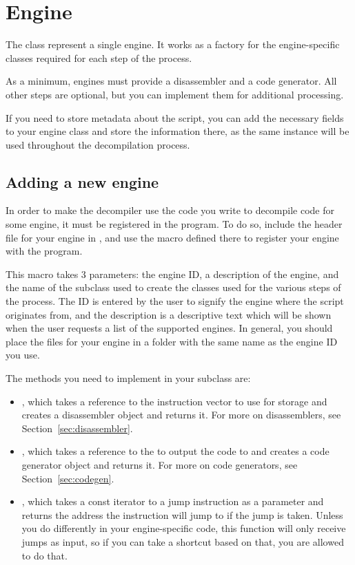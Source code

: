 \newpage\section{Engine}
The  class represent a single engine. It works as a factory for the engine-specific classes required for each step of the process.

As a minimum, engines must provide a disassembler and a code generator. All other steps are optional, but you can implement them for additional processing.

If you need to store metadata about the script, you can add the necessary fields to your engine class and store the information there, as the same instance will be used throughout the decompilation process.

\subsection{Adding a new engine}
In order to make the decompiler use the code you write to decompile code for some engine, it must be registered in the program. To do so, include the header file for your engine in , and use the  macro defined there to register your engine with the program.

This macro takes 3 parameters: the engine ID, a description of the engine, and the name of the  subclass used to create the classes used for the various steps of the process. The ID is entered by the user to signify the engine where the script originates from, and the description is a descriptive text which will be shown when the user requests a list of the supported engines. In general, you should place the files for your engine in a folder with the same name as the engine ID you use.

The methods you need to implement in your  subclass are:
\begin{itemize}
\item {}, which takes a reference to the instruction vector to use for storage and creates a disassembler object and returns it. For more on disassemblers, see Section~\vref{sec:disassembler}.
\item {}, which takes a reference to the  to output the code to and creates a code generator object and returns it. For more on code generators, see Section~\vref{sec:codegen}.
\item {}, which takes a const iterator to a jump instruction as a parameter and returns the address the instruction will jump to if the jump is taken. Unless you do differently in your engine-specific code, this function will only receive jumps as input, so if you can take a shortcut based on that, you are allowed to do that.
\end{itemize}

